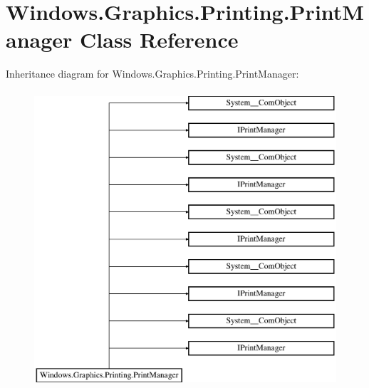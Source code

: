 \hypertarget{class_windows_1_1_graphics_1_1_printing_1_1_print_manager}{}\section{Windows.\+Graphics.\+Printing.\+Print\+Manager Class Reference}
\label{class_windows_1_1_graphics_1_1_printing_1_1_print_manager}
Inheritance diagram for Windows.\+Graphics.\+Printing.\+Print\+Manager\+:\begin{figure}[H]
\begin{center}
\leavevmode
\includegraphics[height=11.000000cm]{class_windows_1_1_graphics_1_1_printing_1_1_print_manager}
\end{center}
\end{figure}
